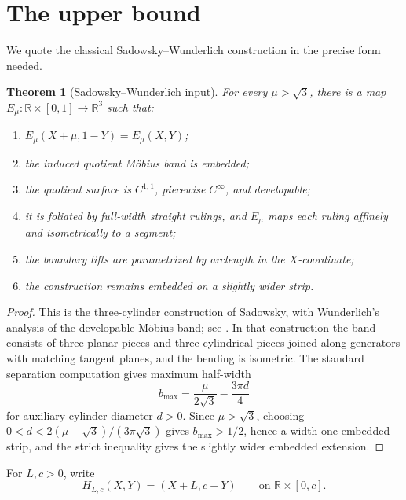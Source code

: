 \documentclass[12pt]{article}
\newcommand{\R}{\mathbb R}
\theoremstyle{plain}
\newtheorem{theorem}{Theorem}
\begin{document}
\section{The upper bound}

We quote the classical Sadowsky--Wunderlich construction in the precise form
needed.

\begin{theorem}[Sadowsky--Wunderlich input]\label{thm:sadowsky}
For every \(\mu>\sqrt3\), there is a map
\(E_\mu:\R\times[0,1]\to\R^3\) such that:
\begin{enumerate}
\item \(E_\mu(X+\mu,1-Y)=E_\mu(X,Y)\);
\item the induced quotient M\"obius band is embedded;
\item the quotient surface is \(C^{1,1}\), piecewise \(C^\infty\), and
developable;
\item it is foliated by full-width straight rulings, and \(E_\mu\) maps each
ruling affinely and isometrically to a segment;
\item the boundary lifts are parametrized by arclength in the \(X\)-coordinate;
\item the construction remains embedded on a slightly wider strip.
\end{enumerate}
\end{theorem}

\begin{proof}
This is the three-cylinder construction of Sadowsky, with Wunderlich's
analysis of the developable M\"obius band; see \cite{Sad30,Wun62}.  In that
construction the band consists of three planar pieces and three cylindrical
pieces joined along generators with matching tangent planes, and the bending is
isometric.  The standard separation computation gives maximum half-width
\[
b_{\max}=\frac{\mu}{2\sqrt3}-\frac{3\pi d}{4}
\]
for auxiliary cylinder diameter \(d>0\).  Since \(\mu>\sqrt3\), choosing
\(0<d<2(\mu-\sqrt3)/(3\pi\sqrt3)\) gives \(b_{\max}>1/2\), hence a width-one
embedded strip, and the strict inequality gives the slightly wider embedded
extension.
\end{proof}

For \(L,c>0\), write
\[
H_{L,c}(X,Y)=(X+L,c-Y)\qquad\text{on }\R\times[0,c].
\]
\end{document}
